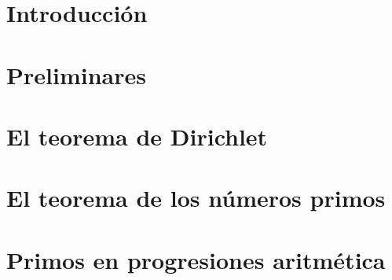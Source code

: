 \documentclass[12pt]{book}
\begin{document}
\setcounter{page}{1}
\chapter*{Introducción}

\blankpages
\chapter{Preliminares}

\blankpages
\chapter{El teorema de Dirichlet}

\blankpages
\chapter{El teorema de los números primos}

\blankpages
\chapter{Primos en progresiones aritmética}

\nocite{*}
\blankpages


\end{document}
